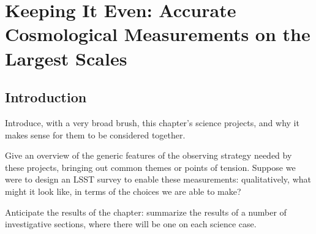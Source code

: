 
\chapter[Cosmology]{Keeping It Even: Accurate Cosmological Measurements on the Largest
Scales}
\label{chp:cosmology}




\section{Introduction}
\label{sec:cosmology:intro}

Introduce, with a very broad brush, this chapter's science projects,
and why it makes sense for them to be considered together.





Give an overview of the generic features of the observing strategy
needed by these projects, bringing out common themes or points of
tension. Suppose we were to design an LSST survey to enable these
measurements: qualitatively, what might it look like, in terms of the
choices we are able to make?

Anticipate the results of the chapter: summarize the results of a
number of investigative sections, where there will be one on each
science case.






% 


% 

